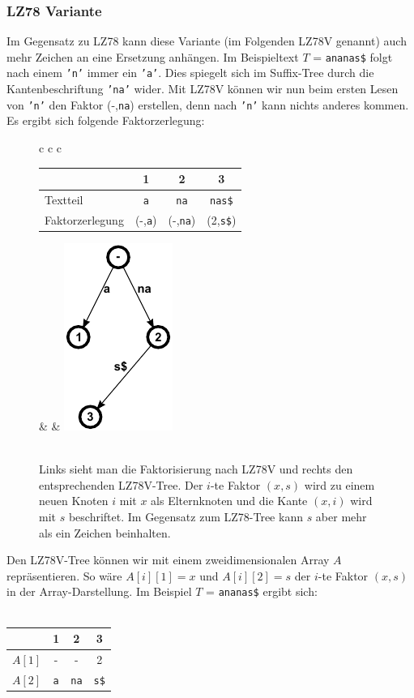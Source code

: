 \documentclass[a4paper,11pt]{scrartcl}%
\theoremstyle{change}
\theoremstyle{nonumberplain}
\theoremstyle{change}
\theoremstyle{nonumberplain}
\theoremstyle{change}
\theoremstyle{nonumberplain}
\begin{document}
	\subsubsection{LZ78 Variante}\label{sec:lz78-variante}
	Im Gegensatz zu LZ78 kann diese Variante (im Folgenden LZ78V genannt) auch mehr Zeichen an eine Ersetzung anhängen.
	Im Beispieltext $T$ = \texttt{ananas\$} folgt nach einem \texttt{'n'} immer ein \texttt{'a'}. Dies spiegelt sich im Suffix-Tree durch die Kantenbeschriftung \texttt{'na'} wider. Mit LZ78V können wir nun beim ersten Lesen von \texttt{'n'} den Faktor (-,\texttt{na}) erstellen, denn nach \texttt{'n'} kann nichts anderes kommen. Es ergibt sich folgende Faktorzerlegung:\\
	\begin{figure}[h]
	\begin{tabular}[t]{c c c}
		\begin{tabular}[b]{l c c c}\hline
			& 1 & 2 & 3  \\ \hline
  		Textteil & \texttt{a} & \texttt{na} & \texttt{nas\$} \\ \hline
  		Faktorzerlegung & (-,\texttt{a}) & (-,\texttt{na}) & (2,\texttt{s\$}) \\ \hline
		\end{tabular} & \hspace{2cm} & \includegraphics{ananas_LZ78VTree}\\\\
	\end{tabular}
	\caption{Links sieht man die Faktorisierung nach LZ78V und rechts den entsprechenden LZ78V-Tree. Der $i$-te Faktor $(x,s)$ wird zu einem neuen Knoten $i$ mit $x$ als Elternknoten und die Kante $(x,i)$ wird mit $s$ beschriftet. Im Gegensatz zum LZ78-Tree kann $s$ aber mehr als ein Zeichen beinhalten.}
	\label{fig:lz78v}
	\end{figure}
	
	Den LZ78V-Tree können wir mit einem zweidimensionalen Array $A$ repräsentieren. So wäre $A[i][1] = x$ und $A[i][2] = s$ der $i$-te Faktor $(x,s)$ in der Array-Darstellung. Im Beispiel $T$ = \texttt{ananas\$} ergibt sich:\\\\
	\begin{tabular}[b]{l c c c}
						\hline
							& 1 & 2 & 3 \\\hline
						$A[1]$ & - & - & 2 \\\hline
						$A[2]$	& \texttt{a} & \texttt{na} & \texttt{s\$}\\\hline
						
			
	\end{tabular}
	
\end{document}
